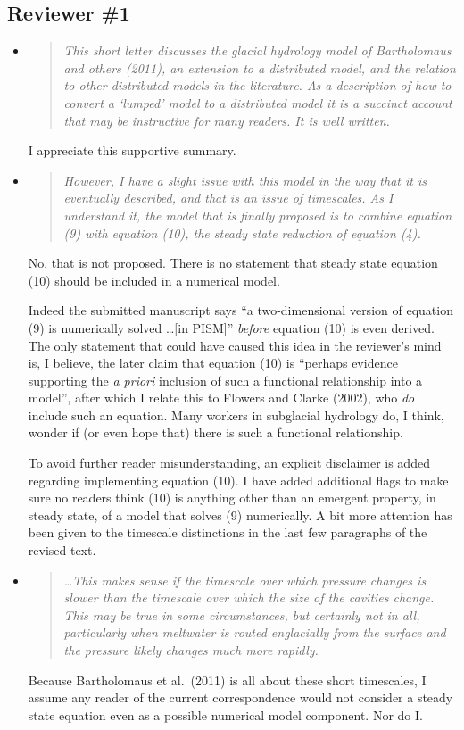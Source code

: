 \documentclass[11pt,reqno]{amsart}
\newcommand{\reply}[2]{
\medskip\medskip
\item  \begin{quote}
\emph{#1}
\end{quote}

\medskip
\noindent #2}
\begin{document}
\subsection*{Reviewer \#1}  \begin{itemize}
\reply{This short letter discusses the glacial hydrology model of Bartholomaus and others (2011), an extension to a distributed model, and the relation to other distributed models in the literature.  As a description of how to convert a `lumped' model to a distributed model it is a succinct account that may be instructive for many readers.  It is well written.}
{I appreciate this supportive summary.}

\reply{However, I have a slight issue with this model in the way that it is eventually described, and that is an issue of timescales.  As I understand it, the model that is finally proposed is to combine equation (9) with equation (10), the steady state reduction of equation (4).}
{No, that is not proposed.  There is no statement that steady state equation (10) should be included in a numerical model.

Indeed the submitted manuscript says ``a two-dimensional version of equation (9) is numerically solved \dots [in PISM]'' \emph{before} equation (10) is even derived.  The only statement that could have caused this idea in the reviewer's mind is, I believe, the later claim that equation (10) is ``perhaps evidence supporting the \emph{a priori} inclusion of such a functional relationship into a model'', after which I relate this to Flowers and Clarke (2002), who \emph{do} include such an equation.  Many workers in subglacial hydrology do, I think, wonder if (or even hope that) there is such a functional relationship.

To avoid further reader misunderstanding, an explicit disclaimer is added regarding implementing equation (10).  I have added additional flags to make sure no readers think (10) is anything other than an emergent property, in steady state, of a model that solves (9) numerically.  A bit more attention has been given to the timescale distinctions in the last few paragraphs of the revised text.}

\reply{\dots This makes sense if the timescale over which pressure changes is slower than the timescale over which the size of the cavities change. This may be true in some circumstances, but certainly not in all, particularly when meltwater is routed englacially from the surface and the pressure likely changes much more rapidly.}
{Because Bartholomaus et al.~(2011) is all about these short timescales, I assume any reader of the current correspondence would not consider a steady state equation even as a possible numerical model component.  Nor do I.

}
\end{itemize}
\end{document}
